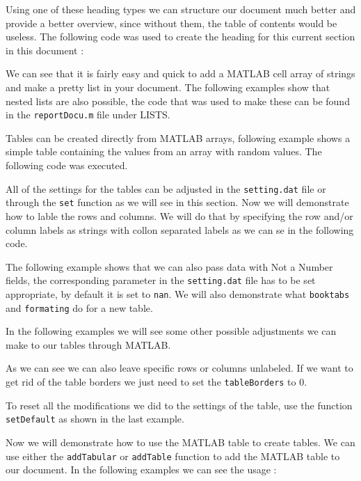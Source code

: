 
Using one of these heading types we can structure our document much better and provide a better overview, since
without them, the table of contents would be useless. The following code was used to create the heading for this
current section in this document :


We can see that it is fairly easy and quick to add a MATLAB cell array of strings and make a pretty list in 
your document. The following examples show that nested lists are also possible, the code that was used to make these 
can be found in the {\tt reportDocu.m} file under LISTS. 


Tables can be created directly from MATLAB arrays, following example shows a simple table containing the values 
from an array with random values. The following code was executed.


All of the settings for the tables can be adjusted in the {\tt setting.dat} file or through the {\tt set} 
function as we will see in this section. Now we will demonstrate how to lable the rows and columns. We will
do that by specifying the row and/or column labels as strings with collon separated labels as we can se in 
the following code. 


The following example shows that we can also pass data with Not a Number fields, the corresponding parameter 
in the {\tt setting.dat} file has to be set appropriate, by default it is set to {\tt nan}. We will also demonstrate 
what {\tt booktabs} and {\tt formating} do for a new table.



In the following examples we will see some other possible adjustments we can make to our tables through MATLAB.
 

As we can see we can also leave specific rows or columns unlabeled. If we want to get rid of the table borders
we just need to set the {\tt tableBorders} to 0.


To reset all the modifications we did to the settings of the table, use the function {\tt setDefault} as shown in the 
last example.


Now we will demonstrate how to use the MATLAB table to create tables. We can use either the {\tt addTabular} or {\tt addTable}
function to add the MATLAB table to our document. In the following examples we can see the usage :

